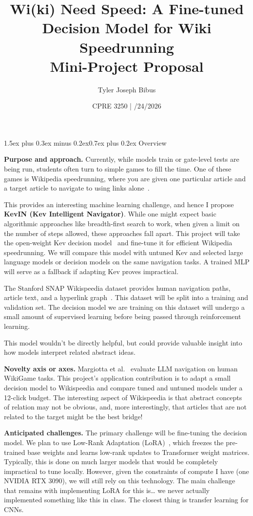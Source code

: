 \documentclass[10pt,letterpaper]{article}
\title{\Large\textbf{Wi(ki) Need Speed: A Fine-tuned Decision Model for Wiki Speedrunning}\\[0.3em]
  \large Mini-Project Proposal}
\author{Tyler Joseph Bibus}
\date{CPRE 3250 \quad | \quad 10/24/2026}
\makeatletter
\renewcommand{\section}{\@startsection{section}{1}{0pt}
  {1.5ex plus 0.3ex minus 0.2ex}{0.7ex plus 0.2ex}
  {\normalfont\large\bfseries}}
\makeatother
\begin{document}
\maketitle
\vspace{-1.5em}

\section{Overview}

\textbf{Purpose and approach.}
Currently, while models train or gate-level tests are being run, students often turn to simple games to fill the time.
One of these games is Wikipedia speedrunning, where you are given one particular article and a target article to navigate to using links alone~\cite{wikispeedia}.

This provides an interesting machine learning challenge, and hence I propose \textbf{KevIN (Kev Intelligent Navigator)}.
While one might expect basic algorithmic approaches like breadth-first search to work, when given a limit on the number of steps allowed, these approaches fall apart.
This project will take the open-weight Kev decision model~\cite{kev} and fine-tune it for efficient Wikipedia speedrunning.
We will compare this model with untuned Kev and selected large language models or decision models on the same navigation tasks. A trained MLP will serve as a fallback if adapting Kev proves impractical.

The Stanford SNAP Wikispeedia dataset provides human navigation paths, article text, and a hyperlink graph~\cite{wikispeedia}. This dataset will be split into a training and validation set.
The decision model we are training on this dataset will undergo a small amount of supervised learning before being passed through reinforcement learning.

This model wouldn't be directly helpful, but could provide valuable insight into how models interpret related abstract ideas.

\textbf{Novelty axis or axes.}
Margiotta et al.~\cite{wikigame} evaluate LLM navigation on human WikiGame
tasks. This project's application contribution is to adapt a small decision
model to Wikispeedia and compare tuned and untuned models under a 12-click budget.
The interesting aspect of Wikispeedia is that abstract concepts of relation may not be obvious, and, more interestingly, that articles that are not related to the target might be the best bridge!



\textbf{Anticipated challenges.}
The primary challenge will be fine-tuning the decision model.
We plan to use Low-Rank Adaptation (LoRA)~\cite{lora}, which freezes the
pre-trained base weights and learns low-rank updates to Transformer weight matrices.
Typically, this is done on much larger models that would be completely impractical to tune locally.
However, given the constraints of compute I have (one NVIDIA RTX 3090), we will still rely on this technology.
The main challenge that remains with implementing LoRA for this is\ldots{} we never actually implemented something like this in class.
The closest thing is transfer learning for CNNs.
\end{document}
